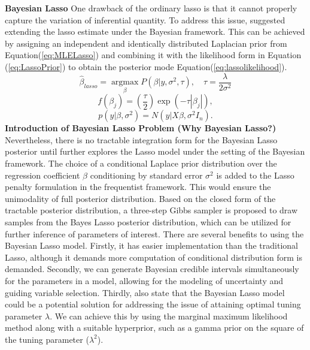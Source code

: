 \textbf{Bayesian Lasso}
One drawback of the ordinary lasso is that it cannot properly capture the variation of inferential quantity. To address this issue, \cite{tibshirani_1996} suggested extending the lasso estimate under the Bayesian framework. This can be achieved by assigning an independent and identically distributed Laplacian prior from Equation(\ref{eq:MLELasso}) and combining it with the likelihood form in Equation (\ref{eq:LassoPrior}) to obtain the posterior mode Equation(\ref{eq:lassolikelihood}). 
\begin{equation}
	\label{eq:MLELasso}
	\hat{\beta}_{lasso} = \underset{\beta}{\operatorname{argmax}}P(\beta|y,\sigma^2,\tau), \quad \tau = \frac{\lambda}{2\sigma^2}
\end{equation}
\begin{equation}
	\label{eq:LassoPrior}
	f(\beta_j) = (\frac{\tau}{2}) \exp(-\tau|\beta_j|),
\end{equation}
\begin{equation}
	\label{eq:lassolikelihood}
	p(y |\beta,\sigma^2) = N(y|X\beta,\sigma^2I_n).
\end{equation}
\textbf{Introduction of Bayesian Lasso Problem (Why Bayesian Lasso?)}
Nevertheless, there is no tractable integration form for the Bayesian Lasso posterior until \cite{park_casella_2008} further explores the Lasso model under the setting of the Bayesian framework. The choice of a conditional Laplace prior distribution over the regression coefficient $\beta$ conditioning by standard error $\sigma^2$ is added to the Lasso penalty formulation in the frequentist framework. This would ensure the unimodality of full posterior distribution. Based on the closed form of the tractable posterior distribution, a three-step Gibbs sampler is proposed to draw samples from the Bayes Lasso posterior distribution, which can be utilized for further inference of parameters of interest.
There are several benefits to using the Bayesian Lasso model. Firstly, it has easier implementation than the traditional Lasso, although it demands more computation of conditional distribution form is demanded. Secondly, we can generate Bayesian credible intervals simultaneously for the parameters in a model, allowing for the modeling of uncertainty and guiding variable selection.
Thirdly, \cite{park_casella_2008} also state that the Bayesian Lasso model could be a potential solution for addressing the issue of attaining optimal tuning parameter $\lambda$. We can achieve this by using the marginal maximum likelihood method along with a suitable hyperprior, such as a gamma prior on the square of the tuning parameter ($\lambda^2$).
